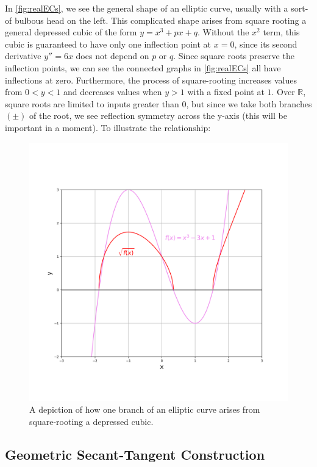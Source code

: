 \documentclass[11pt, a4paper]{report}
\newcommand{\reals}{\mathbb{R}}
\begin{document}
In \ref{fig:realECs}, we see the general shape of an elliptic curve, usually with a sort-of bulbous head on the left. This complicated shape arises from square rooting a general depressed cubic of the form $y=x^3+px+q$. Without the $x^2$ term, this cubic is guaranteed to have only one inflection point at $x=0$, since its second derivative $y'' = 6x$ does not depend on $p$ or $q$. Since square roots preserve the inflection points, we  can see the connected graphs in \ref{fig:realECs} all have inflections at zero.
Furthermore, the process of square-rooting increases values from $0<y<1$ and decreases values when $y>1$ with a fixed point at $1$. Over $\reals$, square roots are limited to inputs greater than $0$, but since we take both branches $(\pm)$ of the root, we see reflection symmetry across the y-axis (this will be important in a moment). To illustrate the relationship: 
\begin{figure}[ht]
\begin{center}
\includegraphics[width=\linewidth]{cubic_function.png} 
\caption{A depiction of how one branch of an elliptic curve arises from square-rooting a depressed cubic.}
\label{fig:cubicsqrt}
\end{center}
\end{figure}

\subsection{Geometric Secant-Tangent Construction}
\end{document}
